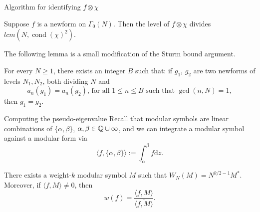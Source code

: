 \documentclass[handout]{beamer}
\newcommand{\fc}{\mathfrak{c}}
\DeclareMathOperator{\cond}{cond}
\begin{document}
\begin{frame}{Algorithm for identifying $f \otimes \chi$}

\begin{Lemma}[Li]
Suppose $f$ is a newform on $\Gamma_0(N)$. Then the level of $f \otimes \chi$ divides $lcm(N, \cond(\chi)^2)$. 
\end{Lemma}

The following lemma is a small modification of the Sturm bound argument. 
\begin{Lemma}[C.]
For every $N \geq 1$, there exists an integer $B$ such that:  if $g_1$, $g_2$ are  two newforms of levels $N_1,N_2$, both dividing $N$ and 
\[
	a_n(g_1) = a_n(g_2), \, \mbox{for all }1 \leq n \leq B \mbox{ such that } \gcd(n,N) = 1,
\]
then $g_1 = g_2$.
\end{Lemma}

\end{frame}


\begin{frame}{Computing the pseudo-eigenvalue}
Recall that modular symbols are linear combinations of $\{\alpha, \beta\}$, $\alpha, \beta \in \mathbb{Q} \cup \infty$, 
and we can integrate a modular symbol against a modular form via
\[
	\langle f, \{\alpha, \beta\} \rangle := \int_{\alpha}^{\beta} f \textrm{d} z. 
\]
\begin{Lemma}[C.]
There exists a weight-$k$ modular symbol $M$ such that $W_N(M) = N^{k/2 -1} M^*$. Moreover, if $\langle f, M \rangle \neq 0$, then 
\[
	w(f) = \frac{\langle f,M \rangle }{\overline{\langle f,M \rangle}}.
\]
\end{Lemma} 
\end{frame}



\iffalse
\begin{frame}{Further work}
\begin{itemize}
\item relation to automorphic side: \\ psuedo-eigenvalues relates to epsilon factors of $\pi_{f \otimes \chi}$. \\
Another way to determine the local components of $\pi_f$. 
 
\item Let $\fc$ be a cusp of prime denominator $p \geq 5$. Seems that $a_1(f_\fc)$ is only divisible by primes that are $\pm 1 \mod{p}$. \\
 Can we prove this? 
 \end{itemize}
\end{frame}
\fi
\end{document}

